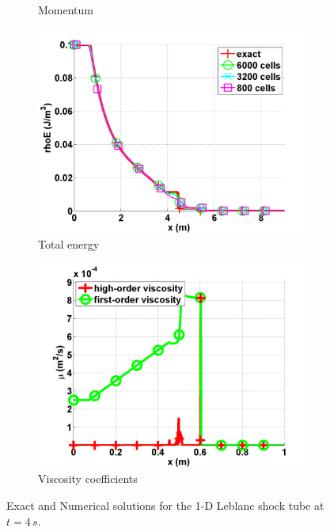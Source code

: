 \documentclass[review,10pt]{elsarticle}
\begin{document}
\begin{figure}[H]
\begin{subfigure}[b]{0.495\textwidth}
                \caption{Momentum}
                \label{fig:1d_leblanc_density}
        \end{subfigure}
        \begin{subfigure}[b]{0.495\textwidth}
                \centering
                \includegraphics[width=\textwidth]{figures/Leblanc_exact_and_numerical_stt_total_energy_6000.png}
                \caption{Total energy}
                \label{fig:1d_leblanc_press}
        \end{subfigure}
        \begin{subfigure}[b]{0.495\textwidth}
                \centering
                \includegraphics[width=\textwidth]{figures/Leblanc_viscosity_numerical_6000.png}
                \caption{Viscosity coefficients}
                \label{fig:1d_leblanc_visc}
        \end{subfigure}
        \caption{Exact and Numerical solutions for the 1-D Leblanc shock tube at $t=4\,s$.}\label{fig:1d_leblanc}
\end{figure}
\end{document}
